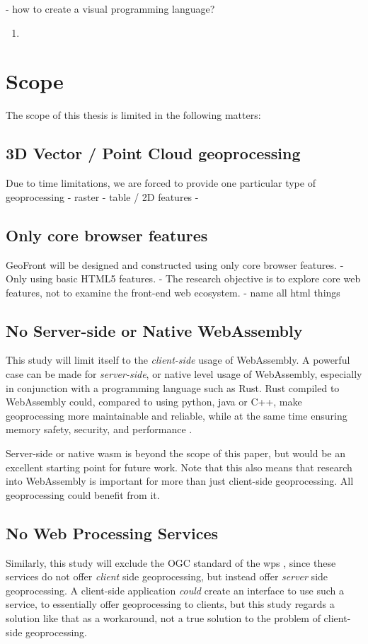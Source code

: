 - how to create a visual programming language?

\begin{enumerate}
  \item 
\end{enumerate}

\newpage
\section{Scope}
The scope of this thesis is limited in the following matters: 

\subsection{ 3D Vector / Point Cloud geoprocessing}
Due to time limitations, we are forced to provide one particular type of geoprocessing
- raster
- table / 2D features
- 


\subsection{ Only core browser features }
GeoFront will be designed and constructed using only core browser features. 
- Only using basic HTML5 features.
- The research objective is to explore core web features, not to examine the front-end web ecosystem. 
- name all html things



\subsection*{ No Server-side or Native WebAssembly } 
This study will limit itself to the \emph{client-side} usage of WebAssembly. 
A powerful case can be made for \emph{server-side}, or native level usage of WebAssembly, especially in conjunction with a programming language such as Rust. 
Rust compiled to WebAssembly could, compared to using python, java or C++, make geoprocessing more maintainable and reliable, while at the same time ensuring memory safety, security, and performance \cite{clack_standardizing_2019}. 

Server-side or native wasm is beyond the scope of this paper, but would be an excellent starting point for future work. Note that this also means that research into WebAssembly is important for more than just client-side geoprocessing. All geoprocessing could benefit from it.



\subsection*{ No Web Processing Services } 
Similarly, this study will exclude the OGC standard of the \ac{wps} \cite{ogc_web_2015}, since these services do not offer \emph{client} side geoprocessing, but instead offer \emph{server} side geoprocessing. A client-side application \textit{could} create an interface to use such a service, to essentially offer geoprocessing to clients, but this study regards a solution like that as a workaround, not a true solution to the problem of client-side geoprocessing. 

